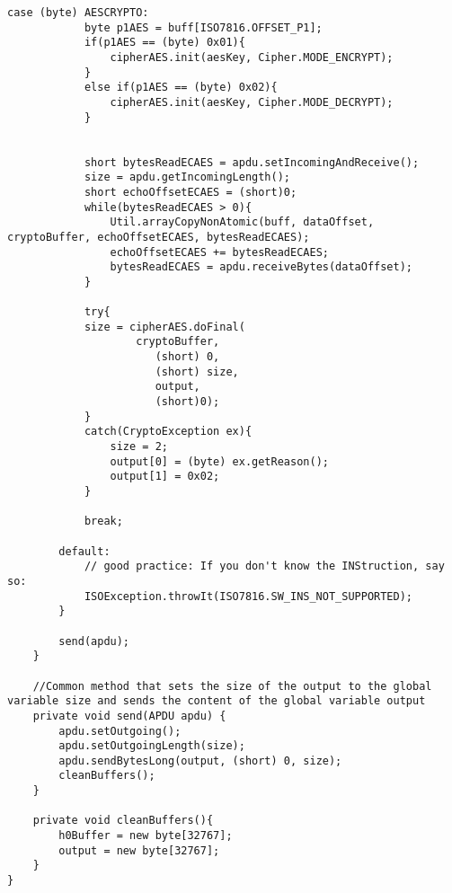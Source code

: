 \begin{lstlisting}[caption=SecureCard.java.,breaklines=true,breakatwhitespace=false, label=lst:SecureCard,escapechar=!]
		case (byte) AESCRYPTO:
			byte p1AES = buff[ISO7816.OFFSET_P1];
			if(p1AES == (byte) 0x01){
				cipherAES.init(aesKey, Cipher.MODE_ENCRYPT);
			}
			else if(p1AES == (byte) 0x02){
				cipherAES.init(aesKey, Cipher.MODE_DECRYPT);
			}


			short bytesReadECAES = apdu.setIncomingAndReceive();
			size = apdu.getIncomingLength();
			short echoOffsetECAES = (short)0;
			while(bytesReadECAES > 0){
				Util.arrayCopyNonAtomic(buff, dataOffset, cryptoBuffer, echoOffsetECAES, bytesReadECAES);
				echoOffsetECAES += bytesReadECAES;
				bytesReadECAES = apdu.receiveBytes(dataOffset);
			}

			try{
			size = cipherAES.doFinal(
					cryptoBuffer,
		               (short) 0,
		               (short) size,
		               output,
		               (short)0);
			}
			catch(CryptoException ex){
				size = 2;
				output[0] = (byte) ex.getReason();
				output[1] = 0x02;
			}

			break;

		default:
			// good practice: If you don't know the INStruction, say so:
			ISOException.throwIt(ISO7816.SW_INS_NOT_SUPPORTED);
		}

		send(apdu);
	}

	//Common method that sets the size of the output to the global variable size and sends the content of the global variable output
	private void send(APDU apdu) {
		apdu.setOutgoing();
		apdu.setOutgoingLength(size);
		apdu.sendBytesLong(output, (short) 0, size);
		cleanBuffers();
	}

	private void cleanBuffers(){
		h0Buffer = new byte[32767];
		output = new byte[32767];
	}
}
\end{lstlisting}
